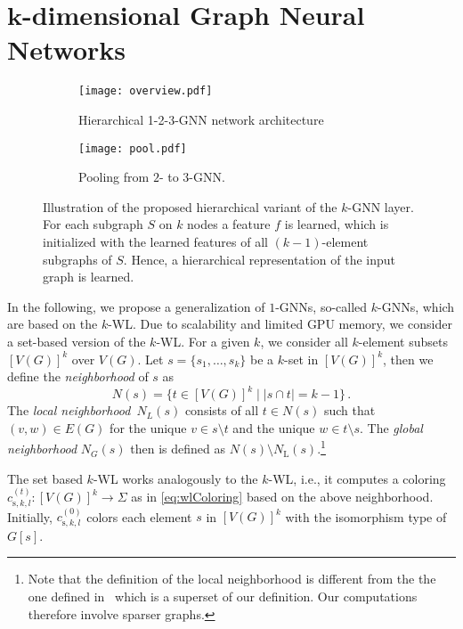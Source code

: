 \documentclass[letterpaper]{article}
\theoremstyle{definition}
\begin{document}
\section{$\boldsymbol{k}$-dimensional Graph Neural Networks}

\begin{figure*}[t]
	\centering
	\begin{subfigure}[b]{0.65\linewidth}
		\centering
		\texttt{[image: overview.pdf]}
		\caption{Hierarchical 1-2-3-GNN network architecture}\label{fig:architecture}
	\end{subfigure}
	\hspace{-.5cm}
	\begin{subfigure}[b]{0.28\linewidth}
		\centering
		\texttt{[image: pool.pdf]}
		\caption{Pooling from $2$- to $3$-GNN.}\label{fig:pooling}
	\end{subfigure}
	\caption{Illustration of the proposed hierarchical variant of the $k$-GNN layer. For each subgraph $S$ on $k$ nodes a feature $f$ is learned, which is initialized with the learned features of all $(k-1)$-element subgraphs of $S$. Hence, a hierarchical representation of the input graph is learned.}\label{fig:overview}
\end{figure*}

In the following, we propose a generalization of $1$-GNNs, so-called $k$-GNNs, which are based on the $k$-WL. Due to scalability and limited GPU memory, we consider a set-based version of the $k$-WL. For a given $k$, we consider all $k$-element subsets $[V(G)]^k$ over $V(G)$. Let $s =  \{ s_1, \dotsc, s_k \}$ be a $k$-set in $[V(G)]^k$, then we define the \emph{neighborhood} of $s$ as 
\begin{equation*}\label{eq:localNeighborhood}
	N(s) = \{ t\in [V(G)]^k\mid |s\cap t|=k-1\}\,.
\end{equation*}
The \emph{local neighborhood}\, $N_L(s)$ consists of all $t\in N(s)$ such that $(v,w)\in E(G)$ for the unique $v\in s\setminus t$ and the unique $w\in t\setminus s$. The \emph{global neighborhood} $N_G(s)$ then is defined as $N(s) \setminus N_{\text{L}}(s)$.\footnote{Note that the definition of the local neighborhood is different from the the one defined in~\cite{Mor+2017} which is a superset of our definition. 
Our computations therefore involve sparser graphs.}

The set based $k$-WL works analogously to the $k$-WL, i.e., it computes a coloring $c_{\text{s},k,l}^{(t)} : [V(G)]^k \to \Sigma$ as in \cref{eq:wlColoring} based on the above neighborhood. 
Initially, $c_{\text{s},k,l}^{(0)}$ colors each element $s$ in $[V(G)]^k$ with the isomorphism type of $G[s]$. 
\end{document}

